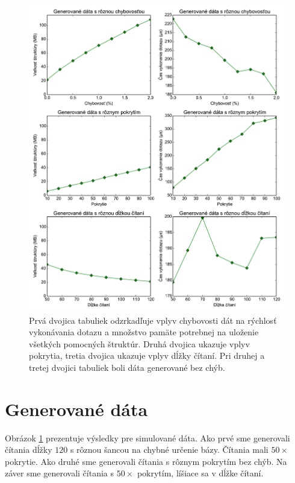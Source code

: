 \begin{figure}

\centerline{\includegraphics[width=1\textwidth]{images/chart_artificial.pdf}}

\caption[Simulované dáta]{Prvá dvojica tabuliek odzrkadľuje vplyv chybovosti dát na rýchlosť vykonávania dotazu a množstvo
pamäte potrebnej na uloženie všetkých pomocných štruktúr. Druhá dvojica ukazuje vplyv pokrytia,
tretia dvojica ukazuje vplyv dĺžky čítaní. Pri druhej a tretej dvojici tabuliek boli dáta generované
bez chýb.}

\label{chart:artificial}

\end{figure}

\section{Generované dáta}

Obrázok \ref{chart:artificial} prezentuje výsledky pre simulované dáta. Ako prvé sme
generovali čítania dĺžky $120$ s rôznou šancou na chybné určenie bázy. Čítania mali
$50\times$ pokrytie. Ako druhé sme generovali čítania s rôznym pokrytím bez chýb.
Na záver sme generovali čítania s $50\times$ pokrytím, líšiace sa v dĺžke
čítaní.

